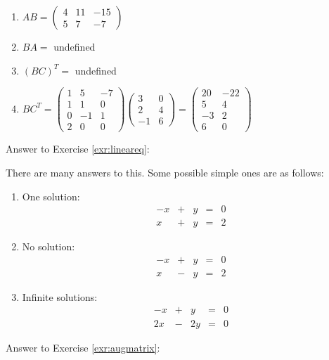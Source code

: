 \documentclass[
]{book}
\theoremstyle{definition}
\theoremstyle{definition}
\theoremstyle{definition}
\theoremstyle{remark}
\begin{document}
\begin{enumerate}
\def\labelenumi{\arabic{enumi}.}
\item
  \(AB = \begin{pmatrix} 4 & 11 & -15 \\ 5 & 7 & -7 \end{pmatrix}\)
\item
  \(BA =\) undefined
\item
  \((BC)^T =\) undefined
\item
  \(BC^T = \begin{pmatrix} 1&5&-7\\1&1&0\\0&-1&1\\2&0&0\end{pmatrix}\begin{pmatrix} 3&0\\2&4\\-1&6 \end{pmatrix} =\begin{pmatrix}20 & -22 \\ 5 & 4 \\ -3 &2 \\6 & 0\end{pmatrix}\)
\end{enumerate}

Answer to Exercise \ref{exr:lineareq}:

There are many answers to this. Some possible simple ones are as follows:

\begin{enumerate}
\def\labelenumi{\arabic{enumi}.}
\item
  One solution: \[\begin{matrix}
           -x  & + & y & = & 0\\
           x & + &  y & = &  2
           \end{matrix}\]
\item
  No solution: \[\begin{matrix}
          -x  & + & y & = & 0\\
          x & - &  y & = &  2
          \end{matrix}\]
\item
  Infinite solutions: \[\begin{matrix}
           -x  & + & y & = & 0\\
           2x & - &  2y & = &  0
           \end{matrix}\]
\end{enumerate}

Answer to Exercise \ref{exr:augmatrix}:
\end{document}
